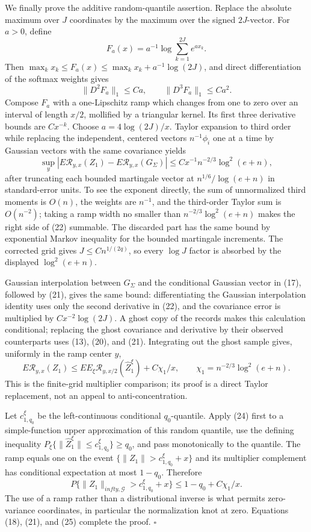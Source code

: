 We finally prove the additive random-quantile assertion.  Replace the
absolute maximum over \(J\) coordinates by the maximum over the signed
\(2J\)-vector.  For \(a>0\), define
\[
 F_a(x)=a^{-1}\log\sum_{k=1}^{2J}e^{ax_k}.
\]
Then \(\max_kx_k\le F_a(x)\le\max_kx_k+a^{-1}\log(2J)\),
and direct differentiation of the softmax weights gives
\[
 \|D^2F_a\|_1\le Ca,
 \qquad \|D^3F_a\|_1\le Ca^2.                             \tag{22}
\]
Compose \(F_a\) with a one-Lipschitz ramp which changes from one to zero
over an interval of length \(x/2\), mollified by a triangular kernel.
Its first three derivative bounds are \(C x^{-k}\).  Choose
\(a=4\log(2J)/x\).  Taylor expansion to third order while replacing the
independent, centered vectors \(n^{-1}\phi_i\) one at a time by Gaussian
vectors with the same covariance yields
\[
 \sup_y|E\mathcal R_{y,x}(Z_1)-E\mathcal R_{y,x}(G_\Sigma)|
 \le Cx^{-1}n^{-2/3}\log^2(e+n),                           \tag{23}
\]
after truncating each bounded martingale vector at
\(n^{1/6}/\log(e+n)\) in standard-error units.  To see the exponent
directly, the sum of unnormalized third moments is \(O(n)\), the weights
are \(n^{-1}\), and the third-order Taylor sum is \(O(n^{-2})\); taking a
ramp width no smaller than \(n^{-2/3}\log^2(e+n)\) makes the right side of
(22) summable.  The discarded part has the same bound by exponential
Markov inequality for the bounded martingale increments.  The corrected
grid gives \(J\le Cn^{1/(2q)}\), so every \(\log J\) factor is absorbed by
the displayed \(\log^2(e+n)\).

Gaussian interpolation between \(G_\Sigma\) and the conditional Gaussian
vector in (17), followed by (21), gives the same bound: differentiating
the Gaussian interpolation identity uses only the second derivative in
(22), and the covariance error is multiplied by
\(C x^{-2}\log(2J)\).  A ghost copy of the records makes this calculation
conditional; replacing the ghost covariance and derivative by their
observed counterparts uses (13), (20), and (21).  Integrating out the
ghost sample gives, uniformly in the ramp center \(y\),
\[
 E\mathcal R_{y,x}(Z_1)
 \le E E_\xi\mathcal R_{y,x/2}(\widehat Z_1^\xi)
   +C\chi_1/x,
 \qquad \chi_1=n^{-2/3}\log^2(e+n).                        \tag{24}
\]
This is the finite-grid multiplier comparison; its proof is a direct
Taylor replacement, not an appeal to anti-concentration.

Let \(c_{1,q_0}^\xi\) be the left-continuous conditional \(q_0\)-quantile.
Apply (24) first to a simple-function upper approximation of this random
quantile, use the defining inequality
\(P_\xi\{\|\widehat Z_1^\xi\|\le c_{1,q_0}^\xi\}\ge q_0\),
and pass monotonically to the quantile.  The ramp equals one on the event
\(\{\|Z_1\|>c_{1,q_0}^\xi+x\}\) and its multiplier complement has
conditional expectation at most \(1-q_0\).  Therefore
\[
 P\{\|Z_1\|_{infty,\mathcal G}>c_{1,q_0}^\xi+x\}
 \le1-q_0+C\chi_1/x.                                      \tag{25}
\]
The use of a ramp rather than a distributional inverse is what permits
zero-variance coordinates, in particular the normalization knot at zero.
Equations (18), (21), and (25) complete the proof. \(\square\)